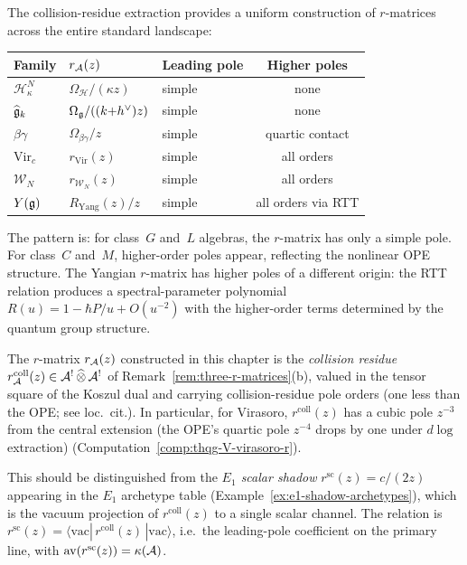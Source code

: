 \begin{remark}
\label{rem:thqg-V-r-matrix-landscape}
The collision-residue extraction provides a uniform construction of
$r$-matrices across the entire standard landscape:
\begin{center}
\renewcommand{\arraystretch}{1.2}
\begin{tabular}{@{}lllc@{}}
\toprule
\textbf{Family} & \textbf{$r_{\mathcal{A}}(z)$}
 & \textbf{Leading pole} & \textbf{Higher poles} \\
\midrule
$\mathcal{H}^N_\kappa$ & $\Omega_{\mathcal{H}}/(\kappa z)$
 & simple & none \\
$\widehat{\mathfrak{g}}_k$ & $\Omega_{\mathfrak{g}}/((k{+}h^\vee)z)$
 & simple & none \\
$\beta\gamma$ & $\Omega_{\beta\gamma}/z$
 & simple & quartic contact \\
$\mathrm{Vir}_c$ & $r_{\mathrm{Vir}}(z)$
 & simple & all orders \\
$\mathcal{W}_N$ & $r_{\mathcal{W}_N}(z)$
 & simple & all orders \\
$Y(\mathfrak{g})$ & $R_{\mathrm{Yang}}(z)/z$
 & simple & all orders via RTT \\
\bottomrule
\end{tabular}
\end{center}
The pattern is: for class~$G$ and~$L$ algebras, the $r$-matrix has
only a simple pole. For class~$C$ and~$M$, higher-order poles
appear, reflecting the nonlinear OPE structure. The Yangian
$r$-matrix has higher poles of a different origin:
the RTT relation produces a spectral-parameter polynomial
$R(u) = 1 - \hbar P/u + O(u^{-2})$ with the higher-order terms
determined by the quantum group structure.
\end{remark}

\begin{remark}
\label{rem:thqg-V-r-matrix-disambiguation}
The $r$-matrix $r_{\mathcal{A}}(z)$ constructed in this chapter is the
\emph{collision residue}
$r_{\mathcal{A}}^{\mathrm{coll}}(z) \in \mathcal{A}^!\,\widehat{\otimes}\,\mathcal{A}^!$ of
Remark~\textup{\ref{rem:three-r-matrices}}\textup{(b)},
valued in the tensor square of the Koszul dual
and carrying collision-residue pole orders (one less than
the OPE; see \textup{loc.\ cit.}).
In particular, for Virasoro,
$r^{\mathrm{coll}}(z)$ has a cubic pole $z^{-3}$ from
the central extension (the OPE's quartic pole $z^{-4}$
drops by one under $d\log$ extraction)
\textup{(}Computation~\textup{\ref{comp:thqg-V-virasoro-r})}.

This should be distinguished from the \emph{$E_1$ scalar shadow}
$r^{\mathrm{sc}}(z) = c/(2z)$ appearing in the $E_1$ archetype table
\textup{(}Example~\textup{\ref{ex:e1-shadow-archetypes})}, which is
the vacuum projection of $r^{\mathrm{coll}}(z)$ to a single
scalar channel. The relation is
$r^{\mathrm{sc}}(z) = \langle\mathrm{vac}|\,
r^{\mathrm{coll}}(z)\,|\mathrm{vac}\rangle$,
i.e.\ the leading-pole coefficient on the primary line,
with $\operatorname{av}(r^{\mathrm{sc}}(z)) = \kappa(\mathcal{A})$.
\end{remark}


